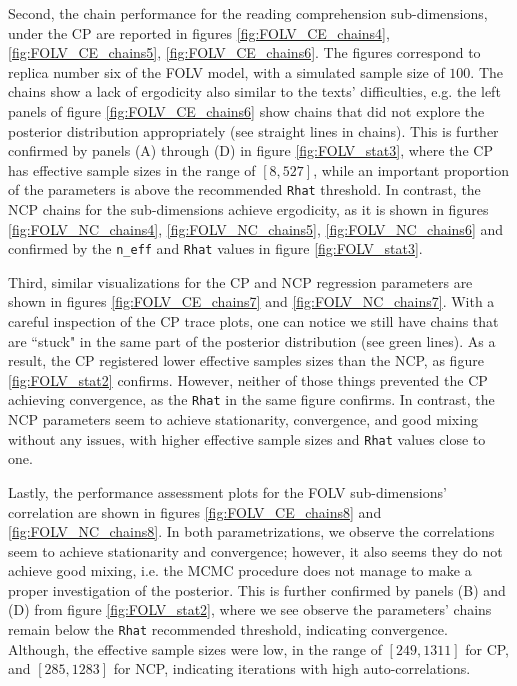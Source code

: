 Second, the chain performance for the reading comprehension sub-dimensions, under the CP are reported in figures \ref{fig:FOLV_CE_chains4}, \ref{fig:FOLV_CE_chains5}, \ref{fig:FOLV_CE_chains6}. The figures correspond to replica number six of the FOLV model, with a simulated sample size of $100$. The chains show a lack of ergodicity also similar to the texts' difficulties, e.g. the left panels of figure \ref{fig:FOLV_CE_chains6} show chains that did not explore the posterior distribution appropriately (see straight lines in chains). This is further confirmed by panels (A) through (D) in figure \ref{fig:FOLV_stat3}, where the CP has effective sample sizes in the range of $[8, 527]$, while an important proportion of the parameters is above the recommended \texttt{Rhat} threshold. In contrast, the NCP chains for the sub-dimensions achieve ergodicity, as it is shown in figures \ref{fig:FOLV_NC_chains4}, \ref{fig:FOLV_NC_chains5}, \ref{fig:FOLV_NC_chains6} and confirmed by the \texttt{n\_eff} and \texttt{Rhat} values in figure \ref{fig:FOLV_stat3}.

Third, similar visualizations for the CP and NCP regression parameters are shown in figures \ref{fig:FOLV_CE_chains7} and \ref{fig:FOLV_NC_chains7}. With a careful inspection of the CP trace plots, one can notice we still have chains that are ``stuck" in the same part of the posterior distribution (see green lines). As a result, the CP registered lower effective samples sizes than the NCP, as figure \ref{fig:FOLV_stat2} confirms. However, neither of those things prevented the CP achieving convergence, as the \texttt{Rhat} in the same figure confirms. In contrast, the NCP parameters seem to achieve stationarity, convergence, and good mixing without any issues, with higher effective sample sizes and \texttt{Rhat} values close to one.

Lastly, the performance assessment plots for the FOLV sub-dimensions' correlation are shown in figures \ref{fig:FOLV_CE_chains8} and \ref{fig:FOLV_NC_chains8}. In both parametrizations, we observe the correlations seem to achieve stationarity and convergence; however, it also seems they do not achieve good mixing, i.e. the MCMC procedure does not manage to make a proper investigation of the posterior. This is further confirmed by panels (B) and (D) from figure \ref{fig:FOLV_stat2}, where we see observe the parameters' chains remain below the \texttt{Rhat} recommended threshold, indicating convergence. Although, the effective sample sizes were low, in the range of $[249, 1311]$ for CP, and $[285, 1283]$ for NCP, indicating iterations with high auto-correlations. 

